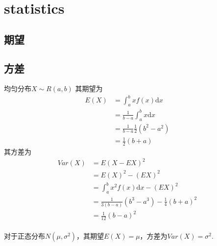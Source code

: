 \chapter{statistics}

\section{期望}
\section{方差}
均匀分布$X \sim R(a, b)$
其期望为
\begin{equation}
    \begin{split}
        E(X) &= \int_{a}^{b}x f(x) \mathrm{d}x		\\
        &= \frac{1}{b-a}\int_{a}^{b}x\mathrm{d}x	\\
        &= \frac{1}{b-a} \frac{1}{2} (b^2 - a^2)	\\
        &= \frac{1}{2}(b + a)
    \end{split}
\end{equation}
其方差为
\begin{equation}
    \begin{split}
        Var(X) &= E(X - EX)^2  \\
        &= E(X)^2 - (EX)^2 \\
        &= \int_{a}^{b} x^2 f(x) \mathrm{d}x - (EX)^2 \\
        &= \frac{1}{3(b-a)} (b^3 - a^3) - \frac{1}{4}(b+a)^2 \\
        &= \frac{1}{12}(b-a)^2
    \end{split}
\end{equation}
\\
对于正态分布$N(\mu, \sigma ^2)$，其期望$E(X) = \mu$，方差为$Var(X) = \sigma^2$.
